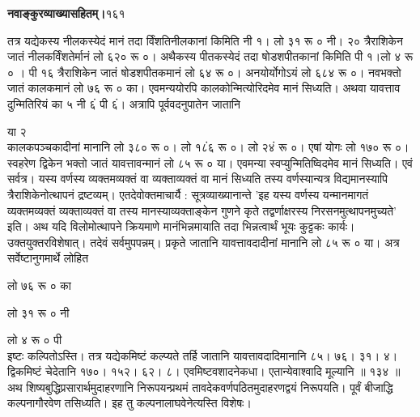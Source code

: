 \documentclass[11pt, openany]{book}
\begin{document}
\thispagestyle{empty}
\newpage

\onehalfspacing
\hspace{2in}\textbf{नवाङ्कुरव्याख्यासहितम्।}\hspace{2in}१६१

\vspace{5mm}

\begin{sloppypar}
\hangindent=0.2in तत्र यद्येकस्य नीलकस्येदं मानं तदा र्विंशतिनीलकानां किमिति नी १। लो ३१ रू ० नी। २० त्रैराशिकेन जातं नीलकर्विंशतेर्मानं लो ६२० रू ०। अथैकस्य पीतकस्येदं तदा षोडशपीतकानां किमिति पी १।लो ४ रू ० । पी १६ त्रैराशिकेन जातं षोडशपीतकमानं लो ६४ रू ०। अनयोर्योगोऽयं लो ६८४ रू ०। नवभक्तो जातं कालकमानं लो ७६ रू ० का। एवमन्ययोरपि कालकोन्मित्योरिदमेव मानं सिध्यति। अथवा यावत्ताव दुन्मितिरियं का ५ नी ६ं पी ६ं। अत्रापि पूर्ववदनुपातेन जातानि 

\hspace{2.7in}या २\\

\hangindent=0.2in कालकपञ्चकादीनां मानानि लो ३८० रू ०। लो १८ं६ रू ०। लो २४ं रू ०। एषां योगः लो १७० रू ०। स्वहरेण द्विकेन भक्तो जातं यावत्तावन्मानं लो ८५ रू ० या। एवमन्या स्वप्युन्मितिष्विदमेव मानं सिध्यति। एवं सर्वत्र। यस्य वर्णस्य व्यक्तमव्यक्तं वा व्यक्ताव्यक्तं वा मानं सिध्यति तस्य वर्णस्यान्यत्र विद्यमानस्यापि त्रैराशिकेनोत्थापनं द्रष्टव्यम्। एतदेवोक्तमाचार्यै : सूत्रव्याख्यानान्ते 'इह यस्य वर्णस्य यन्मानमागतं व्यक्तमव्यक्तं व्यक्ताव्यक्तं वा तस्य मानस्याव्यक्ताङ्केन गुणने कृते तद्वर्णाक्षरस्य निरसनमुत्थापनमुच्यते' इति। अथ यदि विलोमोत्थापने क्रियमाणे मानंभिन्नमायाति तदा भिन्नत्वार्थं भूयः कुट्टकः कार्यः। उक्तयुक्तरविशेषात्। तदेवं सर्वमुपपन्नम्। प्रकृते जातानि यावत्तावदादीनां मानानि लो ८५ रू ० या। अत्र सर्वेष्टानुगमार्थे लोहित

\hspace{0.5in}लो ७६ रू ० का

\hspace{0.5in}लो ३१ रू ० नी

\hspace{0.5in}लो ४\hspace{0.1in} रू ० पी\\

\hangindent=0.2in इष्टः कल्पितोऽस्ति। तत्र यद्येकमिष्टं कल्प्यते तर्हि जातानि यावत्तावदादिमानानि ८५। ७६। ३१। ४। द्विकमिष्टं चेदेतानि १७०। १५२। ६२। ८। एवमिष्टवशादनेकधा। एतान्येवाश्वादि मूल्यानि ॥ १३४ ॥\\

\hangindent=0.2in \hspace{0.2in}अथ शिष्यबुद्धिप्रसारार्थमुदाहरणानि निरूपयन्प्रथमं तावदेकवर्णपठितमुदाहरणद्वयं निरूपयति। पूर्वं बीजाद्धि कल्पनागौरवेण तसिध्यति। इह तु कल्पनालाघवेनेत्यस्ति विशेषः।\\


\end{sloppypar}
\end{document}

